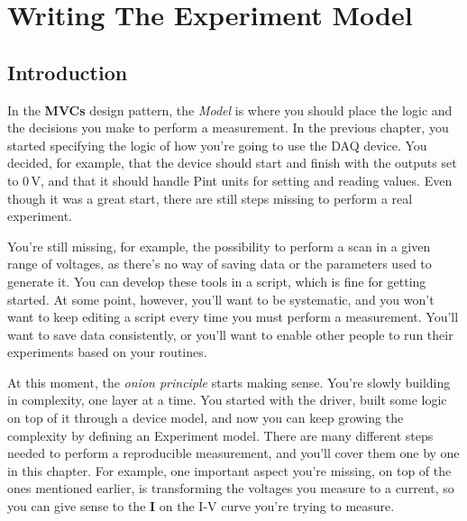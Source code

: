 \chapter{Writing The Experiment Model}\label{ch:experiment-model}

\section{Introduction}\label{sec:experiment-model-introduction}
In the \textbf{MVCs} design pattern, the \emph{Model} is where you should place the logic and the decisions you make to perform a measurement. In the previous chapter, you started specifying the logic of how you're going to use the DAQ device. You decided, for example, that the device should start and finish with the outputs set to $0\,\textrm{V}$, and that it should handle Pint units for setting and reading values. Even though it was a great start, there are still steps missing to perform a real experiment.

You're still missing, for example, the possibility to perform a scan in a given range of voltages, as there's no way of saving data or the parameters used to generate it. You can develop these tools in a script, which is fine for getting started. At some point, however, you'll want to be systematic, and you won't want to keep editing a script every time you must perform a measurement. You'll want to save data consistently, or you'll want to enable other people to run their experiments based on your routines.

At this moment, the \emph{onion principle} starts making sense. You're slowly building in complexity, one layer at a time. You started with the driver, built some logic on top of it through a device model, and now you can keep growing the complexity by defining an Experiment model. There are many different steps needed to perform a reproducible measurement, and you'll cover them one by one in this chapter. For example, one important aspect you're missing, on top of the ones mentioned earlier, is transforming the voltages you measure to a current, so you can give sense to the \textbf{I} on the I-V curve you're trying to measure.


